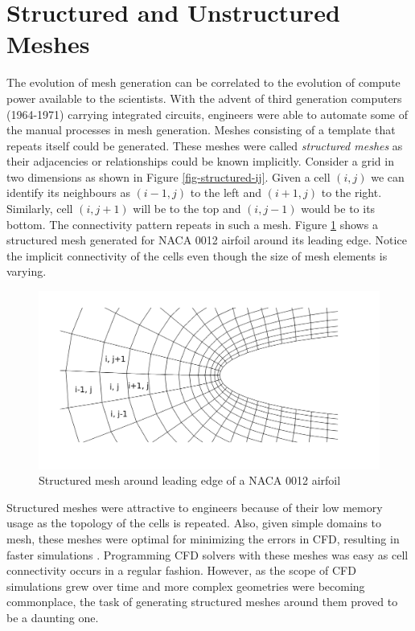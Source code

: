 \section{Structured and Unstructured Meshes}

The evolution of mesh generation can be correlated to the evolution of compute power available to the scientists. With the advent of third generation computers (1964-1971) carrying integrated circuits, engineers were able to automate some of the manual processes in mesh generation. Meshes consisting of a template that repeats itself could be generated. These meshes were called \textit{structured meshes} as their adjacencies or relationships could be known implicitly. Consider a grid in two dimensions as shown in Figure \ref{fig-structured-ij}. Given a cell $(i,j)$ we can identify its neighbours as $(i-1, j)$ to the left and $(i+1, j)$ to the right. Similarly, cell $(i, j+1)$ will be to the top and $(i, j-1)$ would be to its bottom. The connectivity pattern repeats in such a mesh. Figure \ref{fig-structuredNaca0012} shows a structured mesh generated for NACA 0012 airfoil around its leading edge. Notice the implicit connectivity of the cells even though the size of mesh elements is varying.

\begin{figure}
  \centering
  \includegraphics[width=0.8\linewidth]{img/intro/stucturedNaca0012.png}
  \caption{Structured mesh around leading edge of a NACA 0012 airfoil}
  \label{fig-structuredNaca0012}
\end{figure}


Structured meshes were attractive to engineers because of their low memory usage as the topology of the cells is repeated. Also, given simple domains to mesh, these meshes were optimal for minimizing the errors in CFD, resulting in faster simulations \cite{d1991optimal}. Programming CFD solvers with these meshes was easy as cell connectivity occurs in a regular fashion. However, as the scope of CFD simulations grew over time and more complex geometries were becoming commonplace, the task of generating structured meshes around them proved to be a daunting one. 

